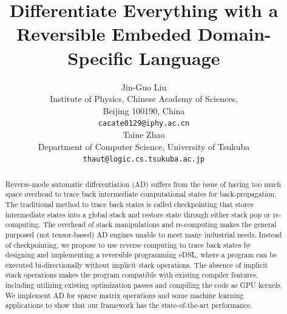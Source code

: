 \documentclass{article}
\newcommand{\<}{\langle}
\renewcommand{\>}{\rangle}
\theoremstyle{definition}\newtheorem{definition}{\textit{Definition}}
\begin{document}
\title{Differentiate Everything with a Reversible Embeded Domain-Specific Language}

\author{Jin-Guo Liu\\
Institute of Physics, Chinese Academy of Sciences,\\Beijing 100190, China\\
\texttt{cacate0129@iphy.ac.cn}\\
\And
Taine Zhao\\
Department of Computer Science, University of Tsukuba\\
\texttt{thaut@logic.cs.tsukuba.ac.jp}\\
}
\maketitle

\begin{abstract}
Reverse-mode automatic differentiation (AD) suffers from the issue of having too much space overhead to trace back intermediate computational states for back-propagation.
The traditional method to trace back states is called checkpointing that stores intermediate states into a global stack and restore state through either stack pop or re-computing.
The overhead of stack manipulations and re-computing makes the general purposed (not tensor-based) AD engines unable to meet many industrial needs.
Instead of checkpointing, we propose to use reverse computing to trace back states by designing and implementing a reversible programming eDSL, where a program can be executed bi-directionally without implicit stack operations. The absence of implicit stack operations makes the program compatible with existing compiler features, including utilizing existing optimization passes and compiling the code as GPU kernels.
We implement AD for sparse matrix operations and some machine learning applications to show that our framework has the state-of-the-art performance.
\end{abstract}
\end{document}
